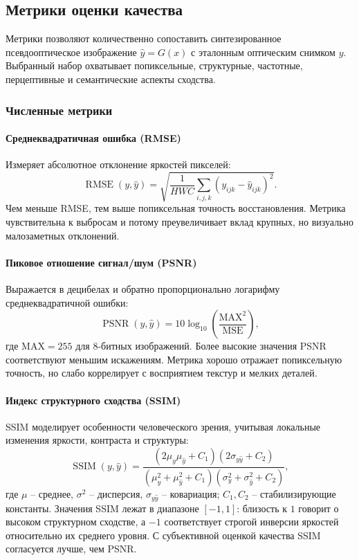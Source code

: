 \subsection{Метрики оценки качества}
\label{subsec:metrics}

Метрики позволяют количественно сопоставить синтезированное псевдооптическое изображение $\hat{y} = G(x)$ с эталонным оптическим снимком $y$.
Выбранный набор охватывает попиксельные, структурные, частотные, перцептивные и семантические аспекты сходства.

\subsubsection{Численные метрики}

\paragraph{Среднеквадратичная ошибка (RMSE)}
Измеряет абсолютное отклонение яркостей пикселей:
\begin{equation}
\operatorname{RMSE}(y, \hat{y}) = \sqrt{\frac{1}{H W C} \sum_{i,j,k} (y_{ijk} - \hat{y}_{ijk})^2}.
\label{eq:rmse}
\end{equation}
Чем меньше RMSE, тем выше попиксельная точность восстановления.
Метрика чувствительна к выбросам и потому преувеличивает вклад крупных, но визуально малозаметных отклонений.

\paragraph{Пиковое отношение сигнал/шум (PSNR)}
Выражается в децибелах и обратно пропорционально логарифму среднеквадратичной ошибки:
\begin{equation}
\operatorname{PSNR}(y, \hat{y}) = 10 \log_{10}\left( \frac{\mathrm{MAX}^2}{\operatorname{MSE}} \right),
\label{eq:psnr}
\end{equation}
где $\mathrm{MAX} = 255$ для 8-битных изображений.
Более высокие значения PSNR соответствуют меньшим искажениям.
Метрика хорошо отражает попиксельную точность, но слабо коррелирует с восприятием текстур и мелких деталей.

\paragraph{Индекс структурного сходства (SSIM)}
SSIM \cite{wang2004image} моделирует особенности человеческого зрения, учитывая локальные изменения яркости, контраста и структуры:
\begin{equation}
\operatorname{SSIM}(y, \hat{y}) = \frac{(2\mu_y \mu_{\hat{y}} + C_1)(2\sigma_{y\hat{y}} + C_2)}{(\mu_y^2 + \mu_{\hat{y}}^2 + C_1)(\sigma_y^2 + \sigma_{\hat{y}}^2 + C_2)},
\label{eq:ssim}
\end{equation}
где $\mu$ -- среднее, $\sigma^2$ -- дисперсия, $\sigma_{y\hat{y}}$ -- ковариация; $C_1, C_2$ -- стабилизирующие константы.
Значения SSIM лежат в диапазоне $[-1, 1]$: близость к $1$ говорит о высоком структурном сходстве, а $-1$ соответствует строгой инверсии яркостей относительно их среднего уровня.
С субъективной оценкой качества SSIM согласуется лучше, чем PSNR.

